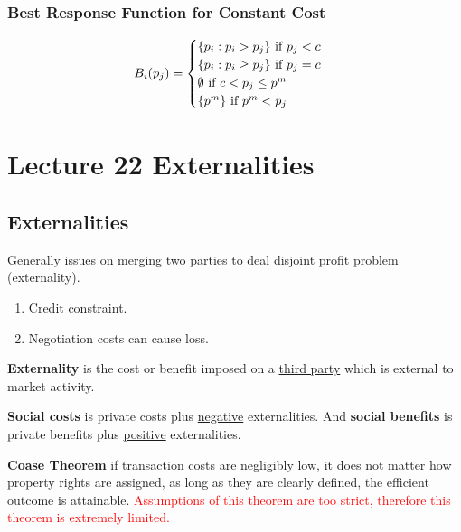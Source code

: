\documentclass[]{article}
\begin{document}
            \subsubsection{Best Response Function for Constant Cost}
                \[
                    B_i(p_j) = 
                    \begin{cases}
                        \{p_i: p_i > p_j\} \text{{ if }} p_j < c \\
                        \{p_i: p_i \geq p_j \} \text{{ if }} p_j = c \\
                        \emptyset \text{{ if }} c < p_j \leq p^m \\
                        \{p^m\} \text{{ if }} p^m < p_j \\
                    \end{cases}
                \]
    \section{Lecture 22 Externalities}
        \subsection{Externalities}
            \par Generally issues on merging two parties to deal disjoint profit problem (externality).
                \begin{enumerate}
                    \item Credit constraint.
                    \item Negotiation costs can cause loss.
                \end{enumerate}
            \begin{definition}
                \textbf{Externality} is the cost or benefit imposed on a \ul{third party} which is external to market activity.
            \end{definition}
            
            \begin{definition}
                \textbf{Social costs} is private costs plus \ul{negative} externalities. And \textbf{social benefits} is private benefits plus \ul{positive} externalities.
            \end{definition}
            
            \begin{theorem}
                \textbf{Coase Theorem} if transaction costs are negligibly low, it does not matter how property rights are assigned, as long as they are clearly defined, the efficient outcome is attainable. \textcolor{red}{Assumptions of this theorem are too strict, therefore this theorem is extremely limited.}
            \end{theorem}
        
\end{document}
